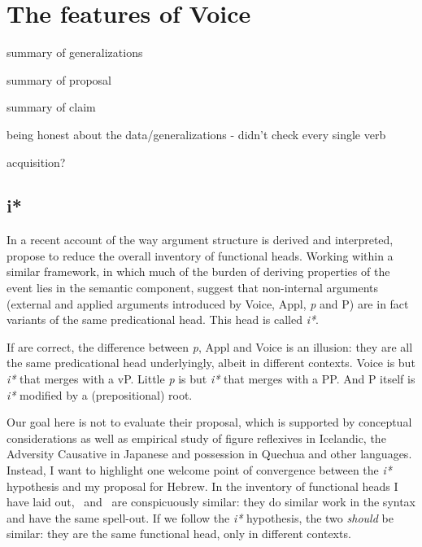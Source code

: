 \chapter{The features of Voice}
\label{chap:i}


summary of generalizations

summary of proposal

summary of claim

being honest about the data/generalizations - didn't check every single verb

acquisition?


\section{i*}
In a recent account of the way argument structure is derived and interpreted, \cite{woodmarantz15} propose to reduce the overall inventory of functional heads. Working within a similar framework, in which much of the burden of deriving properties of the event lies in the semantic component, \citeauthor{woodmarantz15} suggest that non-internal arguments (external and applied arguments introduced by Voice, Appl, \emph{p} and P) are in fact variants of the same predicational head. This head is called \emph{i*}.

If \cite{woodmarantz15} are correct, the difference between \emph{p}, Appl and Voice is an illusion: they are all the same predicational head underlyingly, albeit in different contexts. Voice is but \emph{i*} that merges with a vP. Little \emph{p} is but \emph{i*} that merges with a PP. And P itself is \emph{i*} modified by a (prepositional) root.

Our goal here is not to evaluate their proposal, which is supported by conceptual considerations as well as empirical study of figure reflexives in Icelandic, the Adversity Causative in Japanese and possession in Quechua and other languages. Instead, I want to highlight one welcome point of convergence between the \emph{i*} hypothesis and my proposal for Hebrew. In the inventory of functional heads I have laid out, \vz~and \pz~are conspicuously similar: they do similar work in the syntax and have the same spell-out. If we follow the \emph{i*} hypothesis, the two \emph{should} be similar: they are the same functional head, only in different contexts.

